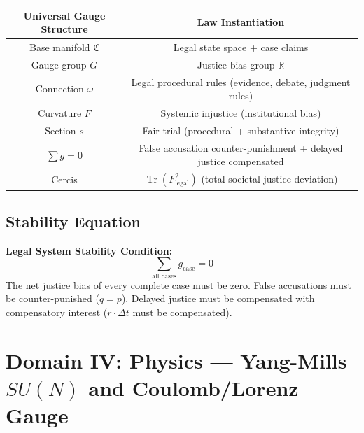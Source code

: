 \documentclass[12pt,a4paper]{article}
\theoremstyle{plain}
\theoremstyle{definition}
\newcommand{\R}{\mathbb{R}}
\newcommand{\curv}{F}
\newcommand{\conn}{\omega}
\newcommand{\ClaimSpace}{\mathfrak{C}}
\DeclareMathOperator{\Tr}{Tr}
\begin{document}
\begin{center}
\begin{tabular}{c|c}
    \toprule
    \textbf{Universal Gauge Structure} & \textbf{Law Instantiation} \\
    \midrule
    Base manifold $\ClaimSpace$ & Legal state space + case claims \\
    Gauge group $G$ & Justice bias group $\R$ \\
    Connection $\conn$ & Legal procedural rules (evidence, debate, judgment rules) \\
    Curvature $\curv$ & Systemic injustice (institutional bias) \\
    Section $s$ & Fair trial (procedural + substantive integrity) \\
    $\sum g = 0$ & False accusation counter-punishment + delayed justice compensated \\
    Cercis & $\Tr(F_{\text{legal}}^2)$ (total societal justice deviation) \\
    \bottomrule
\end{tabular}
\end{center}

\subsection{Stability Equation}

\begin{keyeq}
\textbf{Legal System Stability Condition:}
\begin{equation}
    \boxed{\sum_{\text{all cases}} g_{\text{case}} = 0}
\end{equation}
The net justice bias of every complete case must be zero. False accusations must be counter-punished ($q=p$).
Delayed justice must be compensated with compensatory interest ($r \cdot \Delta t$ must be compensated).
\end{keyeq}

\newpage


\section{Domain IV: Physics — Yang-Mills $SU(N)$ and Coulomb/Lorenz Gauge}
\end{document}
